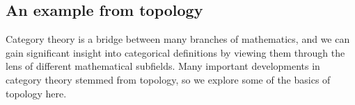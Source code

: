 



\subsection{An example from topology}
Category theory is a bridge between many branches of mathematics, and we
can gain significant insight into categorical definitions by viewing them
through the lens of different mathematical subfields. Many important
developments in category theory stemmed from topology, so we explore
some of the basics of topology here.

